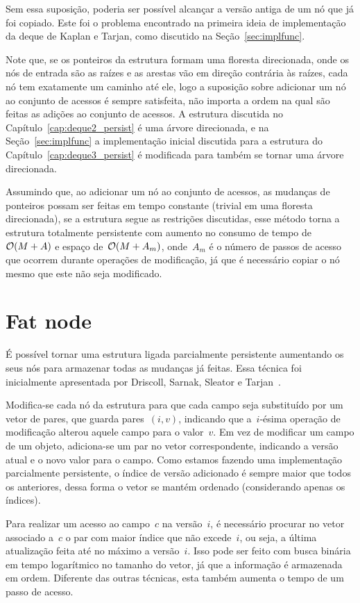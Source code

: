 \documentclass[main.tex]{subfiles}
\begin{document}
Sem essa suposição, poderia ser possível alcançar a versão antiga de um nó que já foi copiado. Este foi o problema encontrado na primeira ideia de implementação da deque de Kaplan e Tarjan, como discutido na Seção~\ref{sec:implfunc}.

Note que, se os ponteiros da estrutura formam uma floresta direcionada, onde os nós de entrada são as raízes e as arestas vão em direção contrária às raízes, cada nó tem exatamente um caminho até ele, logo a suposição sobre adicionar um nó ao conjunto de acessos é sempre satisfeita, não importa a ordem na qual são feitas as adições ao conjunto de acessos. A estrutura discutida no Capítulo~\ref{cap:deque2_persist} é uma árvore direcionada, e na Seção~\ref{sec:implfunc} a implementação inicial discutida para a estrutura do Capítulo~\ref{cap:deque3_persist} é modificada para também se tornar uma árvore direcionada.

Assumindo que, ao adicionar um nó ao conjunto de acessos, as mudanças de ponteiros possam ser feitas em tempo constante (trivial em uma floresta direcionada), se a estrutura segue as restrições discutidas, esse método torna a estrutura totalmente persistente com aumento no consumo de tempo de~$\mathcal{O}(M+A)$ e espaço de~$\mathcal{O}(M+A_m)$, onde~$A_m$ é o número de passos de acesso que ocorrem durante operações de modificação, já que é necessário copiar o nó mesmo que este não seja modificado.


\section{Fat node}

É possível tornar uma estrutura ligada parcialmente persistente aumentando os seus nós para armazenar todas as mudanças já feitas. Essa técnica foi inicialmente apresentada por Driscoll, Sarnak, Sleator e Tarjan~\cite{DriscollSST1989}.

Modifica-se cada nó da estrutura para que cada campo seja substituído por um vetor de pares, que guarda pares~$(i, v)$, indicando que a~$i$-ésima operação de modificação alterou aquele campo para o valor~$v$. Em vez de modificar um campo de um objeto, adiciona-se um par no vetor correspondente, indicando a versão atual e o novo valor para o campo. Como estamos fazendo uma implementação parcialmente persistente, o índice de versão adicionado é sempre maior que todos os anteriores, dessa forma o vetor se mantém ordenado (considerando apenas os índices).

Para realizar um acesso ao campo~$c$ na versão~$i$, é necessário procurar no vetor associado a~$c$ o par com maior índice que não excede~$i$, ou seja, a última atualização feita até no máximo a versão~$i$. Isso pode ser feito com busca binária em tempo logarítmico no tamanho do vetor, já que a informação é armazenada em ordem. Diferente das outras técnicas, esta também aumenta o tempo de um passo de acesso.
\end{document}
